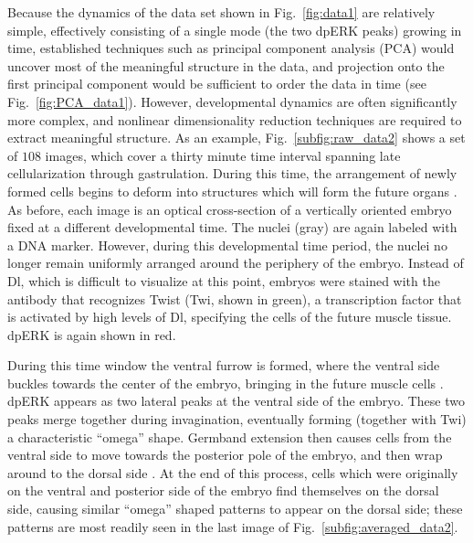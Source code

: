 \documentclass{pnastwo}
\newcommand{\fig}[0]{Fig.}
\begin{document}
\begin{article}
Because the dynamics of the data set shown in \fig~\ref{fig:data1} are relatively simple, effectively consisting of a single mode (the two dpERK peaks) growing in time, established techniques such as principal component analysis (PCA) \cite{shlens2005tutorial} would uncover most of the meaningful structure in the data, and projection onto the first principal component would be sufficient to order the data in time (see \fig~\ref{fig:PCA_data1}).
%
However, developmental dynamics are often significantly more complex, and nonlinear dimensionality reduction techniques are required to extract meaningful structure.
%
As an example, \fig~\ref{subfig:raw_data2} shows a set of $108$ images, which cover a thirty minute time interval spanning late cellularization through gastrulation.
%
During this time, the arrangement of newly formed cells begins to deform into structures which will form the future organs \cite{leptin2005gastrulation}.
%
As before, each image is an optical cross-section of a vertically oriented embryo fixed at a different developmental time.
%
The nuclei (gray) are again labeled with a DNA marker.
%
However, during this developmental time period, the nuclei no longer remain uniformly arranged around the periphery of the embryo.
%
Instead of Dl, which is difficult to visualize at this point, embryos were stained with the antibody that recognizes Twist (Twi, shown in green), a transcription factor that is activated by high levels of Dl, specifying the cells of the future muscle tissue.
%
dpERK is again shown in red.

%
During this time window the ventral furrow is formed, where the ventral side buckles towards the center of the embryo, bringing in the future muscle cells \cite{leptin2005gastrulation}.
%
dpERK appears as two lateral peaks at the ventral side of the embryo.
%
These two peaks merge together during invagination, eventually forming (together with Twi) a characteristic ``omega'' shape.
%
Germband extension then causes cells from the ventral side to move towards the posterior pole of the embryo, and then wrap around to the dorsal side \cite{leptin2005gastrulation}.
%
At the end of this process, cells which were originally on the ventral and posterior side of the embryo find themselves on the dorsal side, causing similar ``omega'' shaped patterns to appear on the dorsal side; these patterns are most readily seen in the last image of \fig~\ref{subfig:averaged_data2}.


\end{article}
\end{document}
